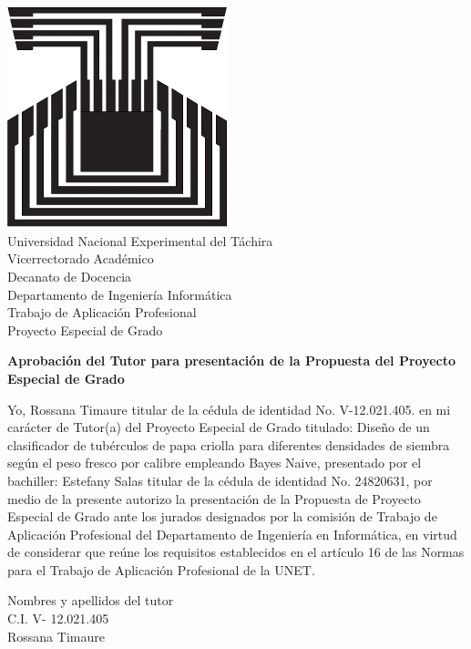 \chapter*{}
\pagestyle{empty}
\thispagestyle{empty}


\begin{center}
\includegraphics[scale=0.2]{unet.jpg}\\

Universidad Nacional Experimental del T\'achira\\

Vicerrectorado Acad\'emico\\

Decanato de Docencia\\

Departamento de Ingenier\'ia Inform\'atica\\

Trabajo de Aplicaci\'on Profesional\\

Proyecto Especial de Grado\\

\end{center}

\begin{center}
\textbf{Aprobaci\'on del Tutor para presentaci\'on de la Propuesta del Proyecto Especial de Grado}
\end{center}

	Yo,  Rossana Timaure  titular de la c\'edula de identidad No. V-12.021.405.  en mi car\'acter de Tutor(a) del Proyecto Especial de Grado titulado: Diseño de un clasificador de tubérculos de papa criolla para diferentes densidades de siembra según el peso fresco por calibre empleando Bayes Naive, presentado por el bachiller: Estefany Salas titular de la c\'edula de identidad No. 24820631, por medio de la presente autorizo la presentaci\'on de la Propuesta de Proyecto Especial de Grado ante los jurados designados por la comisi\'on de Trabajo de Aplicaci\'on Profesional del Departamento de Ingenier\'ia en Inform\'atica, en virtud de considerar que re\'une los requisitos establecidos en el art\'iculo 16 de las Normas para el Trabajo de Aplicaci\'on Profesional de la UNET.\\
	
	
	\begin{center}
	Nombres y apellidos del tutor\\
	
	C.I. V- 12.021.405\\
Rossana Timaure\\
	\end{center}